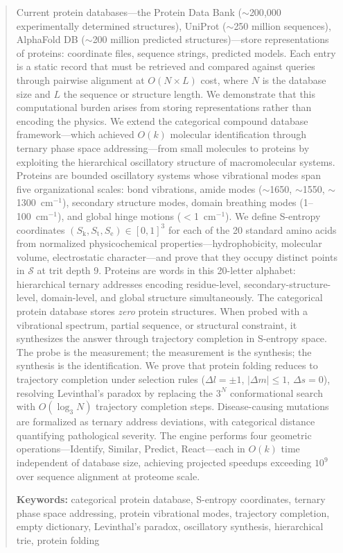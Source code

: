 \documentclass[11pt,twocolumn,a4paper]{article}
\theoremstyle{definition}
\theoremstyle{remark}
\newcommand{\Sk}{S_{\mathrm{k}}}
\newcommand{\St}{S_{\mathrm{t}}}
\newcommand{\Se}{S_{\mathrm{e}}}
\newcommand{\Sspace}{\mathcal{S}}
\begin{document}
\begin{abstract}
Current protein databases---the Protein Data Bank ($\sim$200{,}000 experimentally determined structures), UniProt ($\sim$250 million sequences), AlphaFold DB ($\sim$200 million predicted structures)---store representations of proteins: coordinate files, sequence strings, predicted models. Each entry is a static record that must be retrieved and compared against queries through pairwise alignment at $O(N \times L)$ cost, where $N$ is the database size and $L$ the sequence or structure length. We demonstrate that this computational burden arises from storing representations rather than encoding the physics. We extend the categorical compound database framework---which achieved $O(k)$ molecular identification through ternary phase space addressing---from small molecules to proteins by exploiting the hierarchical oscillatory structure of macromolecular systems. Proteins are bounded oscillatory systems whose vibrational modes span five organizational scales: bond vibrations, amide modes ($\sim$1650, $\sim$1550, $\sim$1300~cm$^{-1}$), secondary structure modes, domain breathing modes (1--100~cm$^{-1}$), and global hinge motions ($<$1~cm$^{-1}$). We define S-entropy coordinates $(\Sk, \St, \Se) \in [0,1]^3$ for each of the 20 standard amino acids from normalized physicochemical properties---hydrophobicity, molecular volume, electrostatic character---and prove that they occupy distinct points in $\Sspace$ at trit depth 9. Proteins are words in this 20-letter alphabet: hierarchical ternary addresses encoding residue-level, secondary-structure-level, domain-level, and global structure simultaneously. The categorical protein database stores \emph{zero} protein structures. When probed with a vibrational spectrum, partial sequence, or structural constraint, it synthesizes the answer through trajectory completion in S-entropy space. The probe is the measurement; the measurement is the synthesis; the synthesis is the identification. We prove that protein folding reduces to trajectory completion under selection rules ($\Delta l = \pm 1$, $|\Delta m| \leq 1$, $\Delta s = 0$), resolving Levinthal's paradox by replacing the $3^N$ conformational search with $O(\log_3 N)$ trajectory completion steps. Disease-causing mutations are formalized as ternary address deviations, with categorical distance quantifying pathological severity. The engine performs four geometric operations---Identify, Similar, Predict, React---each in $O(k)$ time independent of database size, achieving projected speedups exceeding $10^{9}$ over sequence alignment at proteome scale.

\noindent\textbf{Keywords:} categorical protein database, S-entropy coordinates, ternary phase space addressing, protein vibrational modes, trajectory completion, empty dictionary, Levinthal's paradox, oscillatory synthesis, hierarchical trie, protein folding
\end{abstract}
\end{document}
